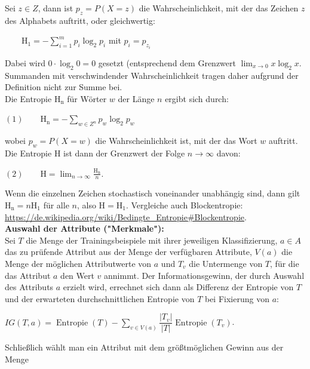 \documentclass[12pt]{article}
\begin{document}
Sei $ z \in Z $, dann ist $ p_z = P(X=z) $ die Wahrscheinlichkeit, mit der das Zeichen $ z $ des Alphabets auftritt, oder gleichwertig:\\ 
\begin{center}
$ \qquad \mathrm{H_1} = - \sum_{i=1}^{m} p_i \log_2 p_i $ mit $ p_i = p_{z_i} $ 
\end{center}
Dabei wird $ 0\cdot\log_2 0=0 $ gesetzt (entsprechend dem Grenzwert $  \lim_{x \rightarrow 0} x \log_2 x $. Summanden mit verschwindender Wahrscheinlichkeit tragen daher aufgrund der Definition nicht zur Summe bei.\\
Die Entropie $ \mathrm{H_n} $ für Wörter $ w $ der Länge $ n $ ergibt sich durch:
\begin{center}
$ (1) \qquad \mathrm{H_n} = -\sum_{w \in Z^n} p_w \log_2 p_w $
\end{center}
wobei $ p_w  = P(X=w)$ die Wahrscheinlichkeit ist, mit der das Wort $  w $ auftritt. \\
Die Entropie $ \mathrm{H} $ ist dann der Grenzwert der Folge $ n\to \infty $ davon:
\begin{center}
$ (2)\qquad \mathrm{H} = \lim_{n\to \infty} \frac {\mathrm{H_n}}{n} $.
\end{center}
Wenn die einzelnen Zeichen stochastisch voneinander unabhängig sind, dann gilt $ \mathrm{H_n} = n \mathrm{H_1} $ für alle $ n $, also $ \mathrm{H} = \mathrm{H_1} $. Vergleiche auch Blockentropie:\\
\url{https://de.wikipedia.org/wiki/Bedingte_Entropie#Blockentropie}.\\[0.3cm]
% 
\textbf{Auswahl der Attribute ("Merkmale"):}\\[0.2cm]
Sei $ T $ die Menge der Trainingsbeispiele mit ihrer jeweiligen Klassifizierung, $ a \in A $ das zu prüfende Attribut aus der Menge der verfügbaren Attribute, $ V(a) $ die Menge der möglichen Attributwerte von $ a $ und $ T_ v$ die Untermenge von $ T $, für die das Attribut $ a $ den Wert $ v $ annimmt. Der Informationsgewinn, der durch Auswahl des Attributs $ a $ erzielt wird, errechnet sich dann als Differenz der Entropie von $ T $ und der erwarteten durchschnittlichen Entropie von $ T $ bei Fixierung von $ a $:\\[0.2cm]
\begin{center}
$ IG(T, a) = \operatorname{Entropie}(T) - \sum_{v \in V(a)} \dfrac{|T_v|}{|T|} \operatorname{Entropie} (T_v) $. \\
\end{center}
Schließlich wählt man ein Attribut mit dem größtmöglichen Gewinn aus der Menge 
\end{document}

